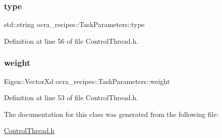 \subsubsection{\texorpdfstring{type}{type}}
{\footnotesize\ttfamily std\+::string ocra\+\_\+recipes\+::\+Task\+Parameters\+::type}



Definition at line 56 of file Control\+Thread.\+h.

\hypertarget{classocra__recipes_1_1TaskParameters_aa960ee789e002d17f148a67cb8b35251}{}\label{classocra__recipes_1_1TaskParameters_aa960ee789e002d17f148a67cb8b35251} 
\subsubsection{\texorpdfstring{weight}{weight}}
{\footnotesize\ttfamily Eigen\+::\+Vector\+Xd ocra\+\_\+recipes\+::\+Task\+Parameters\+::weight}



Definition at line 53 of file Control\+Thread.\+h.



The documentation for this class was generated from the following file\+:\begin{DoxyCompactItemize}
\item 
\hyperlink{ControlThread_8h}{Control\+Thread.\+h}\end{DoxyCompactItemize}
